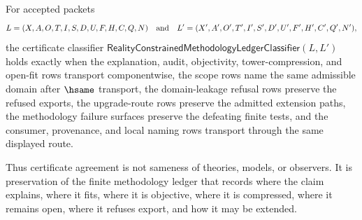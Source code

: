 
\begin{definition}
\label{def:reality-constrained-methodology-ledger-certificate}
For accepted packets
$$
L=(X,A,O,T,I,S,D,U,F,H,C,Q,N)
\quad\hbox{and}\quad
L'=(X',A',O',T',I',S',D',U',F',H',C',Q',N'),
$$
the certificate classifier $\mathsf{RealityConstrainedMethodologyLedgerClassifier}(L,L')$ holds exactly when the explanation, audit, objectivity, tower-compression, and open-fit rows transport componentwise, the scope rows name the same admissible domain after $\hsame$ transport, the domain-leakage refusal rows preserve the refused exports, the upgrade-route rows preserve the admitted extension paths, the methodology failure surfaces preserve the defeating finite tests, and the consumer, provenance, and local naming rows transport through the same displayed route.

Thus certificate agreement is not sameness of theories, models, or observers. It is preservation of the finite methodology ledger that records where the claim explains, where it fits, where it is objective, where it is compressed, where it remains open, where it refuses export, and how it may be extended.
\end{definition}

